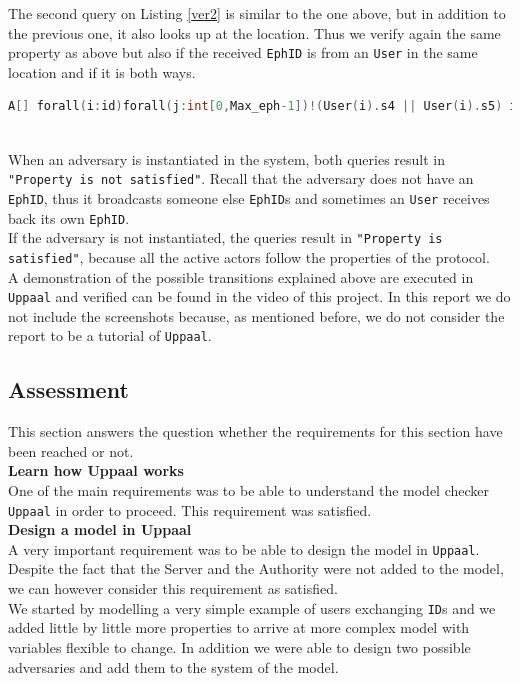 \documentclass[a4paper, twocolumn]{article}
\begin{document}
\noindent The second query on Listing \ref{ver2} is similar to the one above, but in addition to the previous one, it also looks up at the location. Thus we verify again the same property as above but also if the received \texttt{EphID} is from an \texttt{User} in the same location and if it is both ways.
\begin{lstlisting}[language=C, caption= Strong Verifier,label={ver2}]
A[] forall(i:id)forall(j:int[0,Max_eph-1])!(User(i).s4 || User(i).s5) imply (User(i).r_token[j] imply(exists(k:int[0,numEph-1])(User(j/numEph+1).r_token[(i-1)*numEph+k]&&  User(i).r_loc[j] == User(j/numEph+1).r_loc[(i-1)*numEph+k])))
\end{lstlisting} \\

\noindent When an adversary is instantiated in the system, both queries result in \texttt{"Property is not satisfied"}. Recall that the adversary does not have an \texttt{EphID}, thus it broadcasts someone else \texttt{EphID}s and sometimes an \texttt{User} receives back its own \texttt{EphID}.\\
If the adversary is not instantiated, the queries result in \texttt{"Property is satisfied"}, because all the active actors follow the properties of the protocol.\\

\noindent A demonstration of the possible transitions explained above are executed in \texttt{Uppaal} and verified can be found in the video of this project. In this report we do not include the screenshots because, as mentioned before, we do not consider the report to be a tutorial of \texttt{Uppaal}.
\subsection{Assessment}
This section answers the question whether the requirements for this section have been reached or not.\\

\noindent\textbf{Learn how Uppaal works}\\
One of the main requirements was to be able to understand the model checker \texttt{Uppaal} in order to proceed. This requirement was satisfied.\\

\noindent\textbf{Design a model in Uppaal}\\
A very important requirement was to be able to design the model in \texttt{Uppaal}. Despite the fact that the Server and the Authority were not added to the model, we can however consider this requirement as satisfied.\\
We started by modelling a very simple example of users exchanging \texttt{ID}s and we added little by little more properties to arrive at more complex model with variables flexible to change. In addition we were able to design two possible adversaries and add them to the system of the model.\\
\end{document}
